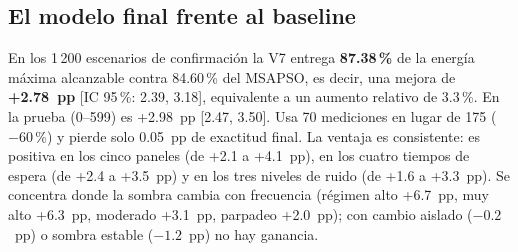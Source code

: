 \documentclass[letterpaper,11pt]{article}
\begin{document}
\subsection{El modelo final frente al baseline}
En los 1\,200 escenarios de confirmación la V7 entrega \textbf{87.38\,\%} de la energía máxima alcanzable contra 84.60\,\% del MSAPSO, es decir, una mejora de \textbf{+2.78~pp} [IC 95\,\%: 2.39, 3.18], equivalente a un aumento relativo de 3.3\,\%. En la prueba (0--599) es +2.98~pp [2.47, 3.50]. Usa 70 mediciones en lugar de 175 ($-60$\,\%) y pierde solo 0.05~pp de exactitud final. La ventaja es consistente: es positiva en los cinco paneles (de +2.1 a +4.1~pp), en los cuatro tiempos de espera (de +2.4 a +3.5~pp) y en los tres niveles de ruido (de +1.6 a +3.3~pp). Se concentra donde la sombra cambia con frecuencia (régimen alto +6.7~pp, muy alto +6.3~pp, moderado +3.1~pp, parpadeo +2.0~pp); con cambio aislado ($-0.2$~pp) o sombra estable ($-1.2$~pp) no hay ganancia.
\end{document}
